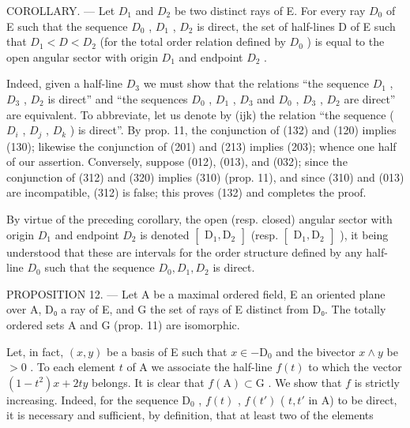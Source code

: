 COROLLARY. --- Let \(D_{1}\) and \(D_{2}\) be two distinct rays of E. For every ray \(D_{0}\) of E such that the sequence \(D_{0}\) , \(D_{1}\) , \(D_{2}\) is direct, the set of half-lines D of E such that \(D_{1} < D < D_{2}\) (for the total order relation defined by \(D_{0}\) ) is equal to the open angular sector with origin \(D_{1}\) and endpoint \(D_{2}\) .

Indeed, given a half-line \(D_{3}\) we must show that the relations “the sequence \(D_{1}\) , \(D_{3}\) , \(D_{2}\) is direct” and “the sequences \(D_{0}\) , \(D_{1}\) , \(D_{3}\) and \(D_{0}\) , \(D_{3}\) , \(D_{2}\) are direct” are equivalent. To abbreviate, let us denote by (ijk) the relation “the sequence ( \(D_{i}\) , \(D_{j}\) , \(D_{k}\) ) is direct”. By prop. 11, the conjunction of (132) and (120) implies (130); likewise the conjunction of (201) and (213) implies (203); whence one half of our assertion. Conversely, suppose (012), (013), and (032); since the conjunction of (312) and (320) implies (310) (prop. 11), and since (310) and (013) are incompatible, (312) is false; this proves (132) and completes the proof.

By virtue of the preceding corollary, the open (resp. closed) angular sector with origin \(D_{1}\) and endpoint \(D_{2}\) is denoted \(\left[\begin{matrix}\mathrm{D}_{1},\mathrm{D}_{2}\end{matrix}\right]\) (resp. \(\left[\begin{matrix}\mathrm{D}_{1},\mathrm{D}_{2}\end{matrix}\right]\) ), it being understood that these are intervals for the order structure defined by any half-line \(D_{0}\) such that the sequence \(D_{0},D_{1},D_{2}\) is direct.

PROPOSITION 12. — Let A be a maximal ordered field, E an oriented plane over A, D₀ a ray of E, and G the set of rays of E distinct from D₀. The totally ordered sets A and G (prop. 11) are isomorphic.

Let, in fact, \((x, y)\) be a basis of E such that \(x \in -\mathrm{D}_{0}\) and the bivector \(x \wedge y\) be \(> 0\) . To each element \(t\) of A we associate the half-line \(f(t)\) to which the vector \((1 - t^{2})x + 2ty\) belongs. It is clear that \(f(\mathrm{A}) \subset \mathrm{G}\) . We show that \(f\) is strictly increasing. Indeed, for the sequence \(\mathrm{D}_{0}\) , \(f(t)\) , \(f(t')\) ( \(t, t'\) in A) to be direct, it is necessary and sufficient, by definition, that at least two of the elements


